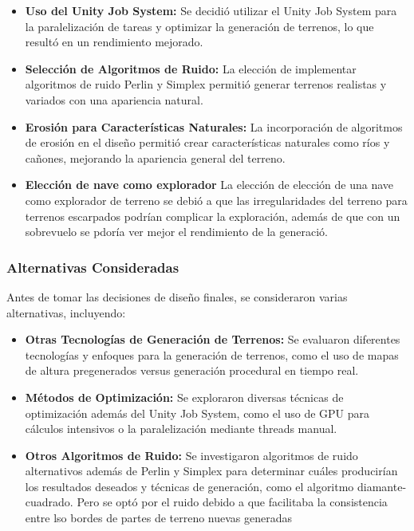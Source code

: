 \begin{itemize}
    \item \textbf{Uso del Unity Job System:} Se decidió utilizar el Unity Job System para la paralelización de tareas y optimizar la generación de terrenos, lo que resultó en un rendimiento mejorado.
    
    \item \textbf{Selección de Algoritmos de Ruido:} La elección de implementar algoritmos de ruido Perlin y Simplex permitió generar terrenos realistas y variados con una apariencia natural.
    
    \item \textbf{Erosión para Características Naturales:} La incorporación de algoritmos de erosión en el diseño permitió crear características naturales como ríos y cañones, mejorando la apariencia general del terreno.
    
    \item \textbf{Elección de nave como explorador} La elección de elección de una nave como explorador de terreno se debió a que las irregularidades del terreno para terrenos escarpados podrían complicar la exploración, además de que con un sobrevuelo se pdoría ver mejor el rendimiento de la generació.
\end{itemize}

\subsubsection{Alternativas Consideradas}
Antes de tomar las decisiones de diseño finales, se consideraron varias alternativas, incluyendo:

\begin{itemize}
    \item \textbf{Otras Tecnologías de Generación de Terrenos:} Se evaluaron diferentes tecnologías y enfoques para la generación de terrenos, como el uso de mapas de altura pregenerados versus generación procedural en tiempo real.
    
    \item \textbf{Métodos de Optimización:} Se exploraron diversas técnicas de optimización además del Unity Job System, como el uso de GPU para cálculos intensivos o la paralelización mediante threads manual.
    
    \item \textbf{Otros Algoritmos de Ruido:} Se investigaron algoritmos de ruido alternativos además de Perlin y Simplex para determinar cuáles producirían los resultados deseados y técnicas de generación, como el algoritmo diamante-cuadrado. Pero se optó por el ruido debido a que facilitaba la consistencia entre lso bordes de partes de terreno nuevas generadas
\end{itemize}

